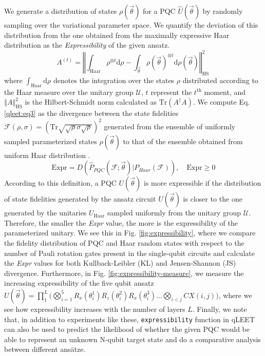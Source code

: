 \documentclass[%
 reprint,
 amsmath,
 amssymb,
 showkeys,
 pra,
 floatfix,
]{revtex4-2}
\begin{document}
We generate a distribution of states $\rho(\vec{\theta})$ for a PQC $\hat{U}(\vec{\theta})$ by randomly sampling over the variational parameter space. We quantify the deviation of this distribution from the one obtained from the maximally expressive Haar distribution as the \textit{Expressibility} of the given ansatz.
\begin{equation}\label{qleet:eq3}
    A^{(t)} =\left\Vert \int_\text{Haar}\rho^{\otimes t} \text{d}\rho - \int_{\vec{\theta}}\rho(\vec{\theta})^{\otimes t} \text{d}\rho(\vec{\theta}) \right\Vert_\text{HS}^2\,
\end{equation}
where $\int_\text{Haar}\text{d}\rho$ denotes the integration over the states $\rho$ distributed according to the Haar measure over the unitary group $\mathcal{U}$, $t$ represent the $t^{\text{th}}$ moment,  and $\left\Vert A \right\Vert_\text{HS}^2$ is the Hilbert-Schmidt norm calculated as $\text{Tr}(A^\dagger A)$. We compute Eq. \ref{qleet:eq3} as the divergence between the state fidelities $\mathcal{F}(\rho, \sigma) = \left(\text{Tr}\sqrt{\sqrt{\rho}\sigma\sqrt{\rho}} \right)^2$ \cite{Jozsa1994} generated from the ensemble of uniformly sampled parameterized states $\rho(\vec{\theta})$ to that of the ensemble obtained from uniform Haar distribution \cite{10.1002/qute.201900070}.
\begin{equation}
    \text{Expr} = D(\hat{P}_{PQC}(\mathcal{F}; \vec{\theta}) | P_{Haar}(\mathcal{F})), \quad \text{Expr} \geq 0
\end{equation}
According to this definition, a PQC $U(\vec{\theta})$ is more expressible if the distribution of state fidelities generated by the ansatz circuit $U(\vec{\theta})$ is closer to the one generated by the unitaries $U_{\text{Haar}}$ sampled uniformly from the unitary group $\mathcal{U}$. Therefore, the smaller the \textit{Expr} value, the more is the expressibility of the parameterized unitary. We see this in  Fig. \ref{fig:expressibility}, where we compare the fidelity distribution of PQC and Haar random states with respect to the number of Pauli rotation gates present in the single-qubit circuits and calculate the \textit{Expr} values for both Kullback-Leibler (KL) and Jensen-Shannon (JS) divergence. Furthermore, in Fig. \ref{fig:expressibility-measure}, we measure the increasing expressibility of the five qubit ansatz $U(\vec{\theta}) =  \prod_{1}^{L}\big(\bigotimes_{i=1}^{5}R_x(\theta_i^1)R_z(\theta_i^2)R_x(\theta_i^3) \ldots \bigotimes_{i<j}CX(i, j)\big)$, where we see how expressibility increases with the number of layers $L$.  Finally, we note that, in addition to experiments like these, \texttt{expressibility} function in qLEET can also be used to predict the likelihood of whether the given PQC would be able to represent an unknown N-qubit target state and do a comparative analysis between different ansätze.
\end{document}

